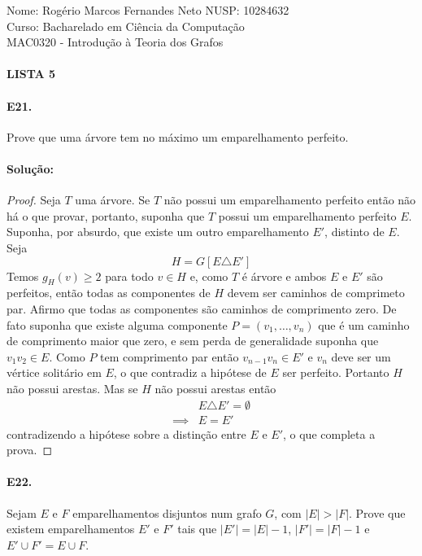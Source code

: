 \documentclass[11pt,a4paper,notitlepage]{exam}
\begin{document}
\begin{center}
    Nome: Rogério Marcos Fernandes Neto\hphantom{xxx} NUSP: 10284632\\
    Curso: Bacharelado em Ciência da Computação\\
    MAC0320 - Introdução à Teoria dos Grafos
    \paragraph{}
    \textbf{LISTA 5}
\end{center}
\paragraph{E21.} Prove que uma árvore tem no máximo um emparelhamento perfeito.
\paragraph{Solução:}
\begin{proof}
    Seja $T$ uma árvore. Se $T$ não possui um  emparelhamento perfeito então não há o que provar,
    portanto, suponha que $T$ possui um emparelhamento perfeito $E$.\\
    Suponha, por absurdo, que existe um
    outro emparelhamento $E'$, distinto de $E$. Seja $$H = G[E\triangle E']$$
    Temos $g_H(v) \geq 2$ para
    todo $v\in H$ e, como $T$ é árvore e ambos $E$ e $E'$ são perfeitos, então todas as componentes de
    $H$ devem ser caminhos de comprimeto par. Afirmo que todas as componentes são caminhos de
    comprimento zero. De fato suponha que existe alguma componente $P = (v_1, \dots, v_n)$ que é um
    caminho de comprimento maior que zero, e sem perda de generalidade suponha que $v_1v_2 \in E$. Como
    $P$ tem comprimento par então $v_{n-1}v_n \in E'$ e $v_n$ deve ser um vértice solitário em $E$, o
    que contradiz a hipótese de $E$ ser perfeito. Portanto $H$ não possui arestas. Mas se $H$ não
    possui arestas então
    \begin{align*}
                 & E\triangle E' = \emptyset \\
        \implies & E = E'
    \end{align*}
    contradizendo a hipótese sobre a
    distinção entre $E$ e $E'$, o que completa a prova.
\end{proof}
\paragraph{E22.} Sejam $E$ e $F$ emparelhamentos disjuntos num grafo $G$,
com $|E| > |F|$. Prove que existem emparelhamentos $E'$ e $F'$ tais que
$|E'| = |E| - 1$, $|F'| = |F| - 1$ e  $E'\cup F' = E\cup F$.\\
\end{document}
